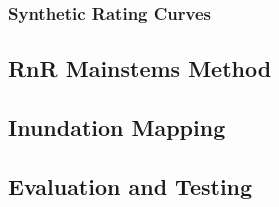 %
\subsubsection{Synthetic Rating Curves}
%

%
\subsection{RnR Mainstems Method}
%

%
\subsection{Inundation Mapping}
%

%
\subsection{Evaluation and Testing}
%

%
